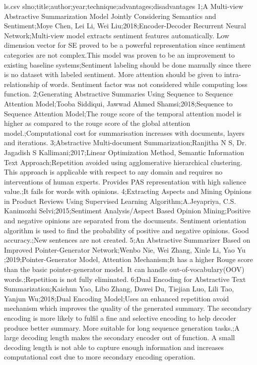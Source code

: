 \documentclass[11pt]{report}
\begin{document}
\begin{filecontents*}{ls.csv}
slno;title;author;year;technique;advantages;disadvantages
1;A Multi-view Abstractive Summarization Model Jointly Considering Semantics and Sentiment;Moye Chen, Lei Li, Wei Liu;2018;Encoder-Decoder Recurrent Neural Network;Multi-view model extracts sentiment features automatically. Low dimension vector for SE proved to be a powerful representation since sentiment categories are not complex.This model was proven to be an improvement to existing baseline systems;Sentiment labeling should be done manually since there is no dataset with labeled sentiment. More attention should be given to intra-relationship of words. Sentiment factor was not considered while computing loss function.
2;Generating Abstractive Summaries Using Sequence to Sequence Attention Model;Tooba Siddiqui, Jawwad Ahmed Shamsi;2018;Sequence to Sequence Attention Model;The rouge score of the temporal attention model is higher as compared to the rouge score of the global attention model.;Computational cost for summarisation increases with documents, layers and iterations.
3;Abstractive Multi-document Summarization;Ranjitha N S, Dr. Jagadish S Kallimani;2017;Linear Optimization Method, Semantic Information Text Approach;Repetition avoided using agglomerative hierarchical clustering. This approach is applicable with respect to any domain and requires no interventions of human experts. Provides PAS representation with high salience value.;It fails for words with opinions.
4;Extracting Aspects and Mining Opinions in Product Reviews Using Supervised Learning Algorithm;A.Jeyapriya, C.S. Kanimozhi Selvi;2015;Sentiment Analysis/Aspect Based Opinion Mining;Positive and negative opinions are separated from the documents. Sentiment orientation algorithm is used to find the probability of positive and negative opinions. Good accuracy.;New sentences are not created.
5;An Abstractive Summarizer Based on Improved Pointer-Generator Network;Wenbo Nie, Wei Zhang, Xinle Li, Yao Yu ;2019;Pointer-Generator Model, Attention Mechanism;It has a higher Rouge score than the basic pointer-generator model. It can handle out-of-vocabulary(OOV) words.;Repetition is not fully eliminated.
6;Dual Encoding for Abstractive Text Summarization;Kaichun Yao, Libo Zhang, Dawei Du, Tiejian Luo, Lili Tao, Yanjun Wu;2018;Dual Encoding Model;Uses an enhanced repetition avoid mechanism which improves the quality of the generated summary. The secondary encoding is more likely to fulfil a fine and selective encoding to help decoder produce better summary. More suitable for long sequence generation tasks.;A large decoding length makes the secondary encoder out of function. A small decoding length is not able to capture enough information and increases computational cost due to more secondary encoding operation.

\end{filecontents*}
\end{document}
